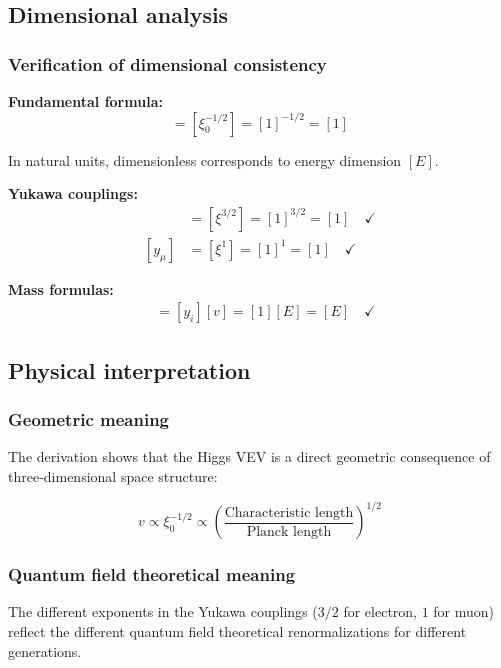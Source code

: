 \subsection{Dimensional analysis}

\subsubsection{Verification of dimensional consistency}

\textbf{Fundamental formula:}
\begin{equation}
	[v] = [\xi_0^{-1/2}] = [1]^{-1/2} = [1]
\end{equation}

In natural units, dimensionless corresponds to energy dimension $[E]$.

\textbf{Yukawa couplings:}
\begin{align}
	[y_e] &= [\xi^{3/2}] = [1]^{3/2} = [1] \quad \checkmark\\
	[y_\mu] &= [\xi^1] = [1]^1 = [1] \quad \checkmark
\end{align}

\textbf{Mass formulas:}
\begin{align}
	[m_i] &= [y_i][v] = [1][E] = [E] \quad \checkmark
\end{align}

\subsection{Physical interpretation}

\subsubsection{Geometric meaning}

The derivation shows that the Higgs VEV is a direct geometric consequence of three-dimensional space structure:

\begin{equation}
	v \propto \xi_0^{-1/2} \propto \left(\frac{\text{Characteristic length}}{\text{Planck length}}\right)^{1/2}
\end{equation}

\subsubsection{Quantum field theoretical meaning}

The different exponents in the Yukawa couplings ($3/2$ for electron, $1$ for muon) reflect the different quantum field theoretical renormalizations for different generations.

